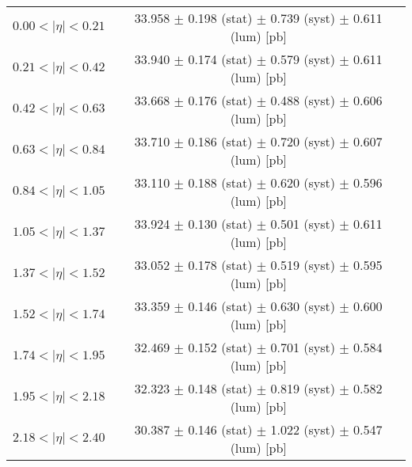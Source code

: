 \begin{tabular}{lc}
\hline
$0.00 < |\eta| <0.21$          & 33.958 $\pm$ 0.198 (stat) $\pm$ 0.739 (syst) $\pm$ 0.611 (lum) [pb]  \\
$0.21 < |\eta| <0.42$          & 33.940 $\pm$ 0.174 (stat) $\pm$ 0.579 (syst) $\pm$ 0.611 (lum) [pb]  \\
$0.42 < |\eta| <0.63$          & 33.668 $\pm$ 0.176 (stat) $\pm$ 0.488 (syst) $\pm$ 0.606 (lum) [pb]  \\
$0.63 < |\eta| <0.84$          & 33.710 $\pm$ 0.186 (stat) $\pm$ 0.720 (syst) $\pm$ 0.607 (lum) [pb]  \\
$0.84 < |\eta| <1.05$          & 33.110 $\pm$ 0.188 (stat) $\pm$ 0.620 (syst) $\pm$ 0.596 (lum) [pb]  \\
$1.05 < |\eta| <1.37$          & 33.924 $\pm$ 0.130 (stat) $\pm$ 0.501 (syst) $\pm$ 0.611 (lum) [pb]  \\
$1.37 < |\eta| <1.52$          & 33.052 $\pm$ 0.178 (stat) $\pm$ 0.519 (syst) $\pm$ 0.595 (lum) [pb]  \\
$1.52 < |\eta| <1.74$          & 33.359 $\pm$ 0.146 (stat) $\pm$ 0.630 (syst) $\pm$ 0.600 (lum) [pb]  \\
$1.74 < |\eta| <1.95$          & 32.469 $\pm$ 0.152 (stat) $\pm$ 0.701 (syst) $\pm$ 0.584 (lum) [pb]  \\
$1.95 < |\eta| <2.18$          & 32.323 $\pm$ 0.148 (stat) $\pm$ 0.819 (syst) $\pm$ 0.582 (lum) [pb]  \\
$2.18 < |\eta| <2.40$          & 30.387 $\pm$ 0.146 (stat) $\pm$ 1.022 (syst) $\pm$ 0.547 (lum) [pb]  \\
\hline
\end{tabular}
